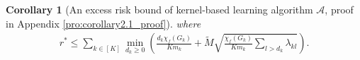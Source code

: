 \documentclass{article}
\def\eE{\mathbb{E}}
\DeclareMathOperator*{\argmin}{argmin}
\newtheorem{corollary}{Corollary}
\begin{document}
\begin{corollary}[An excess risk bound of kernel-based learning algorithm $\mathcal{A}$, proof in Appendix \ref{pro:corollary2.1_proof}]
where
\begin{align} \label{eq: loss bound computing eq}
    r^* \leq \sum _{k \in [K]} \min _{d_k \geq 0} \left( \frac{d_k \chi_f(G_k)}{K m_k} + \widetilde{M} \sqrt{\frac{\chi_f(G_k)}{K m_k} \sum _{l >d_k} \lambda_{kl}} \right).
\end{align}
\end{corollary}


\end{document}
